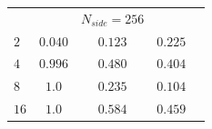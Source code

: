 \begin{table}
\begin{tabular}{@{}lcccc}
 & & $N_{side} = 256$ & \\
$2$ & $ 0.040 $ & $ 0.123 $ & $ 0.225 $ \\ 
$4$ & $ 0.996 $ & $ 0.480 $ & $ 0.404 $  \\
$8$ & $ 1.0 $ & $ 0.235 $ & $ 0.104 $  \\
$16$ & $ 1.0$ & $ 0.584 $ & $ 0.459 $  \\
\hline
\end{tabular} 
\end{table}

